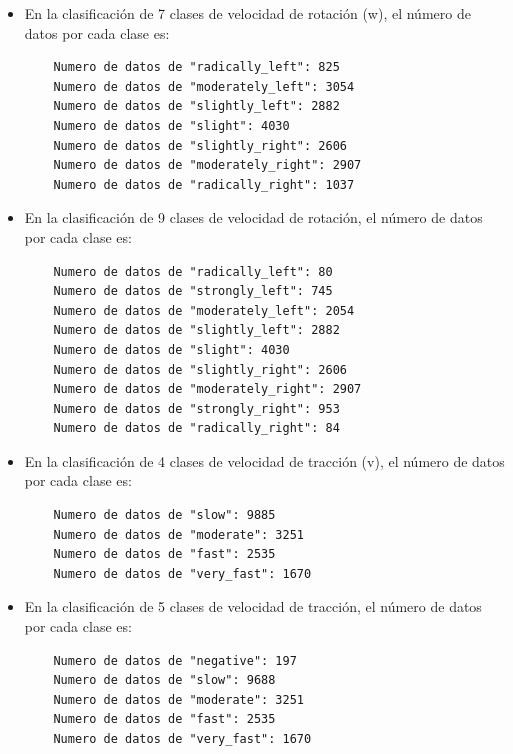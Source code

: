 \begin{itemize}
    \item En la clasificación de 7 clases de velocidad de rotación (w), el número de datos por cada clase es:

    \vspace{10pt}
    \begin{lstlisting}
    Numero de datos de "radically_left": 825
    Numero de datos de "moderately_left": 3054
    Numero de datos de "slightly_left": 2882
    Numero de datos de "slight": 4030
    Numero de datos de "slightly_right": 2606
    Numero de datos de "moderately_right": 2907
    Numero de datos de "radically_right": 1037
    \end{lstlisting}
    \vspace{20pt}


    \item En la clasificación de 9 clases de velocidad de rotación,  el número de datos por cada clase es:

    \vspace{10pt}
    \begin{lstlisting}
    Numero de datos de "radically_left": 80 
    Numero de datos de "strongly_left": 745
    Numero de datos de "moderately_left": 2054
    Numero de datos de "slightly_left": 2882
    Numero de datos de "slight": 4030
    Numero de datos de "slightly_right": 2606
    Numero de datos de "moderately_right": 2907
    Numero de datos de "strongly_right": 953
    Numero de datos de "radically_right": 84
    \end{lstlisting}
    \vspace{20pt}


    \item En la clasificación de 4 clases de velocidad de tracción (v),  el número de datos por cada clase es:

    \vspace{10pt}
    \begin{lstlisting}
    Numero de datos de "slow": 9885
    Numero de datos de "moderate": 3251
    Numero de datos de "fast": 2535
    Numero de datos de "very_fast": 1670
    \end{lstlisting}
    \vspace{20pt}

    \item En la clasificación de 5 clases de velocidad de tracción,  el número de datos por cada clase es:

    \vspace{10pt}
    \begin{lstlisting}
    Numero de datos de "negative": 197
    Numero de datos de "slow": 9688
    Numero de datos de "moderate": 3251
    Numero de datos de "fast": 2535
    Numero de datos de "very_fast": 1670
    \end{lstlisting}
    \vspace{20pt}

\end{itemize}



